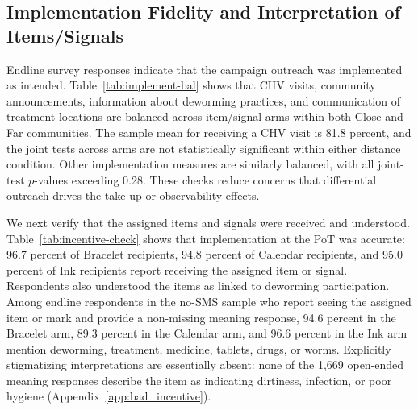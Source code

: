 \documentclass[ECM\space ReStud.tex]{subfiles}
\begin{document}
\subsection{Implementation Fidelity and Interpretation of Items/Signals}
\label{sec:implementation-fidelity}

Endline survey responses indicate that the campaign outreach was implemented as intended. Table~\ref{tab:implement-bal} shows that CHV visits, community announcements, information about deworming practices, and communication of treatment locations are balanced across item/signal arms within both Close and Far communities. The sample mean for receiving a CHV visit is 81.8 percent, and the joint tests across arms are not statistically significant within either distance condition. Other implementation measures are similarly balanced, with all joint-test \(p\)-values exceeding 0.28. These checks reduce concerns that differential outreach drives the take-up or observability effects.

We next verify that the assigned items and signals were received and understood. Table~\ref{tab:incentive-check} shows that implementation at the PoT was accurate: 96.7 percent of Bracelet recipients, 94.8 percent of Calendar recipients, and 95.0 percent of Ink recipients report receiving the assigned item or signal. Respondents also understood the items as linked to deworming participation. Among endline respondents in the no-SMS sample who report seeing the assigned item or mark and provide a non-missing meaning response, 94.6 percent in the Bracelet arm, 89.3 percent in the Calendar arm, and 96.6 percent in the Ink arm mention deworming, treatment, medicine, tablets, drugs, or worms. Explicitly stigmatizing interpretations are essentially absent: none of the 1{,}669 open-ended meaning responses describe the item as indicating dirtiness, infection, or poor hygiene (Appendix~\ref{app:bad_incentive}).
\end{document}
